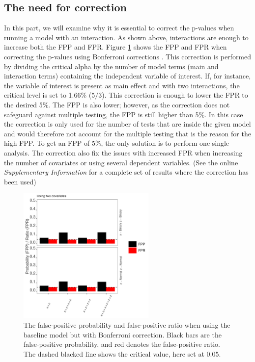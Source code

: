\subsection{The need for correction}
In this part, we will examine why it is essential to correct the p-values when running a model with an interaction. As shown above, interactions are enough to increase both the FPP and FPR. Figure \ref{fig:mainfigure1_bon} shows the FPP and FPR when correcting the p-values using Bonferroni corrections \citep{dunn1961multiple}. This correction is performed by dividing the critical alpha by the number of model terms (main and interaction terms) containing the independent variable of interest. If, for instance, the variable of interest is present as main effect and with two interactions, the critical level is set to 1.66\% ($5/3$). This correction is enough to lower the FPR to the desired 5\%. The FPP is also lower; however, as the correction does not safeguard against multiple testing, the FPP is still higher than 5\%. In this case the correction is only used for the number of tests that are inside the given model and would therefore not account for the multiple testing that is the reason for the high FPP. To get an FPP of 5\%, the only solution is to perform one single analysis. The correction also fix the issues with increased FPR when increasing the number of covariates or using several dependent variables. (See the online \textit{Supplementary Information} for a complete set of results where the correction has been used)

\begin{figure}[hbt!]
\includegraphics[width=0.6\textwidth]{R/Analysis/Result/Figures/Figure1ABon_with.jpeg}
\centering
\caption{The false-positive probability and false-positive ratio when using the baseline model but with Bonferroni correction. Black bars are the false-positive probability, and red denotes the false-positive ratio. The dashed blacked line shows the critical value, here set at 0.05.}
\label{fig:mainfigure1_bon}
\end{figure}

